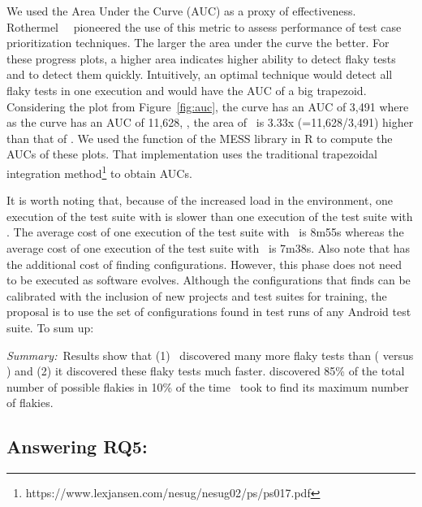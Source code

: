 \documentclass[conference]{IEEEtran}
\begin{document}
We used the Area Under the Curve (AUC) as a proxy of effectiveness. Rothermel~\etal{}~\cite{Rothermel:ICSM99} pioneered the use of this metric to assess performance of test case prioritization techniques. The larger the area under the curve the better. For these progress plots, a higher area indicates higher ability to detect flaky tests and to detect them quickly. Intuitively, an optimal technique would detect all flaky tests in one execution and would have the AUC of a big trapezoid. Considering the plot from Figure~\ref{fig:auc}, the \rerun{} curve has an AUC of 3,491 where as the \tname{} curve has an AUC of 11,628, \ie{}, the area of \tname\ is 3.33x (=11,628/3,491) higher than that of \rerun. We used the  function of the MESS library in R to compute the AUCs of these plots. That implementation uses the traditional trapezoidal integration method\footnote{https://www.lexjansen.com/nesug/nesug02/ps/ps017.pdf} to obtain AUCs. 

It is worth noting that, because of the increased load in the environment, one execution of the test suite with \tname{} is slower than one execution of the test suite with \rerun. The average cost of one execution of the test suite with \tname\ is 8m55s whereas the average cost of one execution of the test suite with \rerun\ is 7m38s.
Also note that \tname{} has the additional cost of finding configurations. However, this phase does not need to be executed as software evolves. Although the configurations that \tname{} finds can be calibrated with the inclusion of new projects and test suites for training, the proposal is to use the set of configurations found in test runs of any Android test suite. To sum up: 

\begin{center}
\begin{tcolorbox}[enhanced,width=3.4in,center upper,drop shadow southwest,sharp corners]
\emph{Summary:}~Results show that (1) \tname\ discovered many more flaky tests than \rerun{} (\percFlakyDetectedShaker{} versus \percFlakyDetectedReRun{}) and (2) it discovered these flaky tests much faster. \tname{} discovered 85\% of the total number of possible flakies in 10\% of the time \rerun\ took to find its maximum number of flakies.
\end{tcolorbox}
\end{center}


\subsection{Answering RQ5: \rqfive}
\label{sec:in-the-wild}
\end{document}
